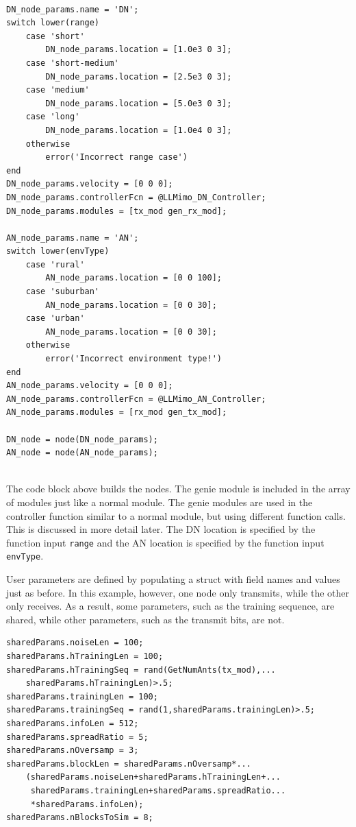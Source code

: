 \begin{lstlisting}[name=llmimoBuild]
% Define nodes

DN_node_params.name = 'DN';
switch lower(range)
    case 'short'
        DN_node_params.location = [1.0e3 0 3];
    case 'short-medium'
        DN_node_params.location = [2.5e3 0 3];
    case 'medium'
        DN_node_params.location = [5.0e3 0 3];
    case 'long'
        DN_node_params.location = [1.0e4 0 3];
    otherwise
        error('Incorrect range case')
end
DN_node_params.velocity = [0 0 0];
DN_node_params.controllerFcn = @LLMimo_DN_Controller;
DN_node_params.modules = [tx_mod gen_rx_mod];

AN_node_params.name = 'AN';
switch lower(envType)
    case 'rural'
        AN_node_params.location = [0 0 100];
    case 'suburban'
        AN_node_params.location = [0 0 30];
    case 'urban'
        AN_node_params.location = [0 0 30];
    otherwise
        error('Incorrect environment type!')
end
AN_node_params.velocity = [0 0 0];
AN_node_params.controllerFcn = @LLMimo_AN_Controller;
AN_node_params.modules = [rx_mod gen_tx_mod];

DN_node = node(DN_node_params);
AN_node = node(AN_node_params);


\end{lstlisting}

The code block above builds the nodes.  The genie module is included
in the array of modules just like a normal module.  The genie
modules are used in the controller function similar to a normal
module, but using different function calls.  This is discussed in
more detail later.  The DN location is specified by the function input \verb+range+ and the AN location is specified by the function input \verb+envType+.

User parameters are defined by populating a struct with field names
and values just as before.  In this example, however, one node only
transmits, while the other only receives.  As a result, some
parameters, such as the training sequence, are shared, while other
parameters, such as the transmit bits, are not.

\begin{lstlisting}[name=llmimoBuild]
% Define shared parameters (packet definition)
sharedParams.noiseLen = 100;
sharedParams.hTrainingLen = 100;
sharedParams.hTrainingSeq = rand(GetNumAnts(tx_mod),...
    sharedParams.hTrainingLen)>.5;
sharedParams.trainingLen = 100;
sharedParams.trainingSeq = rand(1,sharedParams.trainingLen)>.5;
sharedParams.infoLen = 512;
sharedParams.spreadRatio = 5;
sharedParams.nOversamp = 3;
sharedParams.blockLen = sharedParams.nOversamp*...
    (sharedParams.noiseLen+sharedParams.hTrainingLen+...
     sharedParams.trainingLen+sharedParams.spreadRatio...
     *sharedParams.infoLen);
sharedParams.nBlocksToSim = 8;

\end{lstlisting}

